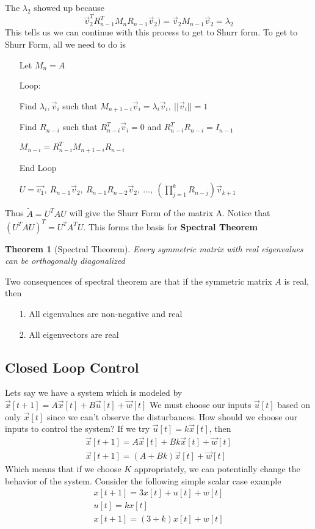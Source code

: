 \documentclass{article}
\newtheorem{theorem}{Theorem}
\begin{document}
The $\lambda_2$ showed up because
$$\vec{v}_2^TR_{n-1}^TM_nR_{n-1}\vec{v}_2)=\vec{v}_2M_{n-1}\vec{v}_2=\lambda_2$$
This tells us we can continue with this process to get to Shurr form.
To get to Shurr Form, all we need to do is
\begin{itemize}
    \item[] Let $M_n=A$
    \item[Loop:]
    \item[] Find $\lambda_i, \vec{v}_i$ such that $M_{n+1-i}\vec{v}_i=\lambda_i\vec{v}_i,\ ||\vec{v}_i||=1$
    \item[] Find $R_{n-i}$ such that $R_{n-i}^T\vec{v}_i=0$ and $R_{n-i}^TR_{n-i}=I_{n-1}$
    \item[] $M_{n-i} = R_{n-i}^TM_{n+1-i}R_{n-i}$
    \item[End Loop]
    \item[] $U = \vec{v_1},\ R_{n-1}\vec{v}_2,\ R_{n-1}R_{n-2}\vec{v}_2,\ ...,\ (\prod_{j=1}^{k}{R_{n-j}})\vec{v}_{k+1}$
\end{itemize}
Thus $\tilde{A}=U^TAU$ will give the Shurr Form of the matrix A.
Notice that $(U^TAU)^T=U^TA^TU$. This forms the basis for \textbf{Spectral Theorem}
\begin{theorem}[Spectral Theorem]
    Every symmetric matrix with real eigenvalues can be orthogonally diagonalized
\end{theorem}
Two consequences of spectral theorem are that if the symmetric matrix $A$ is real, then
\begin{itemize}
    \item[1. ] All eigenvalues are non-negative and real
    \item[2. ] All eigenvectors are real
\end{itemize}

\subsection{Closed Loop Control}
Lets say we have a system which is modeled by $\vec{x}[t+1]=A \vec{x}[t]+B\vec{u}[t]+\vec{w}[t]$
We must choose our inputs $\vec{u}[t]$ based on only $\vec{x}[t]$ since we can't observe the disturbances. How should we choose our inputs to control the system?
If we try $\vec{u}[t]=k\vec{x}[t]$, then
\[
    \begin{array}{c}
        \vec{x}[t+1]=A\vec{x}[t]+Bk\vec{x}[t]+\vec{w}[t]\\
        \vec{x}[t+1]=(A+Bk)\vec{x}[t]+\vec{w}[t]
    \end{array}
\]
Which means that if we choose $K$ appropriately, we can potentially change the behavior of the system.
Consider the following simple scalar case example
\[
    \begin{array}{c}
        x[t+1]=3x[t]+u[t]+w[t]\\
        u[t] = kx[t]\\
        x[t+1] = (3+k)x[t]+w[t]
    \end{array}
\]
\end{document}
